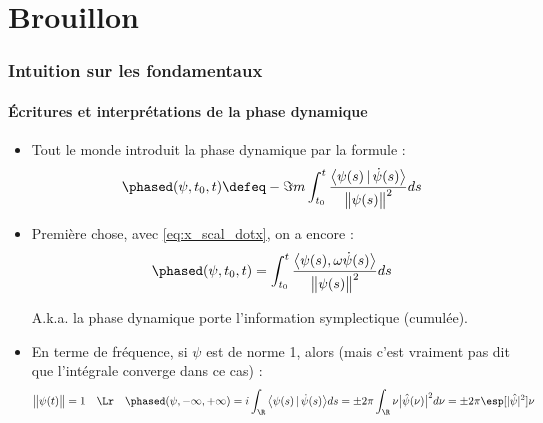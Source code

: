 \setcounter{figure}{0}
\setcounter{lstlisting}{0}

\part{Brouillon}

\section{Intuition sur les fondamentaux}

\subsection{Écritures et interprétations de la phase dynamique}

\begin{itemize}
	
	\item Tout le monde introduit la phase dynamique par la formule :
	\begin{equation}\label{eq:phase_dyn}
		\phased(\psi,t_0,t) \defeq -\Im m \int_{t_0}^t\frac{\big\langle \psi(s) \, |\, \dot{\psi}(s) \big\rangle}{\big\|\psi(s)\big\|^2} ds
	\end{equation}
	
	\item Première chose, avec \eqref{eq:x_scal_dotx}, on a encore :
	\[\phased(\psi,t_0,t) = \int_{t_0}^t\frac{\big\langle \psi(s), \omega\dot{\psi}(s) \big\rangle}{\big\|\psi(s)\big\|^2} ds\]
	
	A.k.a. la phase dynamique porte l'information symplectique (cumulée).
	
	\item En terme de fréquence, si $\psi$ est de norme 1, alors (mais c'est vraiment pas dit que l'intégrale converge dans ce cas) :
	\[\big\|\psi(t)\big\|=1\quad \Lr\quad \phased(\psi, -\infty, +\infty) = i\int_\R \big\langle \psi(s) \, |\, \dot{\psi}(s) \big\rangle ds = \pm 2\pi\int_\R \nu\big|\hat{\psi}(\nu)\big|^2 d\nu = \pm 2\pi \esp[|\hat{\psi}|^2]{\nu}\]
	

\end{itemize}
